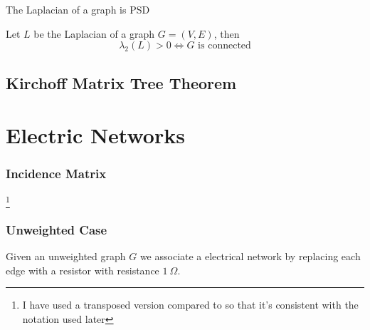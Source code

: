 \begin{Bf}
 The Laplacian of a graph is PSD
\end{Bf}

\begin{Bf}
 Let $L$ be the Laplacian of a graph $G= (V,E)$, then
 $$ \lambda_2(L) > 0 \iff G \text{ is connected}$$
\end{Bf}


\subsection{Kirchoff Matrix Tree Theorem}



\section{Electric Networks}

\subsubsection{Incidence Matrix} 
\footnote{I have used a transposed version compared to \citet{TCS-054} so that it's consistent with the notation used later}
\subsubsection{Unweighted Case}

Given an unweighted graph $G$ we associate a electrical network by replacing each edge with a resistor with resistance $1 \ \Omega$. 





